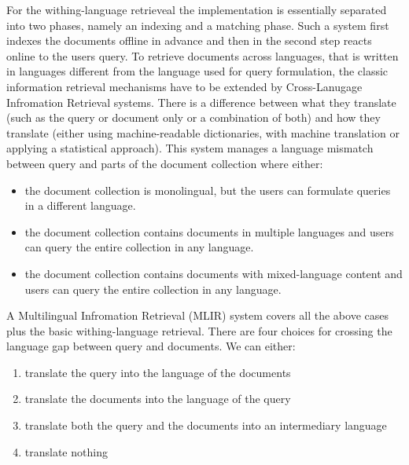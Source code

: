 \documentclass[journal]{IEEEtran}
\begin{document}
For the withing-language retrieveal the implementation is essentially separated into two phases, namely an indexing and a matching phase. Such a system first indexes the documents offline in advance and then in the second step reacts online to the users query. To retrieve documents across languages, that is written in languages different from the language used for query formulation, the classic information retrieval mechanisms have to be extended by Cross-Lanugage Infromation Retrieval systems. There is a difference between what they translate (such as the query or document only or a combination of both) and how they translate (either using machine-readable dictionaries, with machine translation or applying a statistical approach). This system manages a language mismatch between query and parts of the document collection where either:
\begin{itemize}
	\item the document collection is monolingual, but the users can formulate queries in a different language.
	\item the document collection contains documents in multiple languages and users can query the entire collection in any language.
	\item the document collection contains documents with mixed-language content and users can query the entire collection in any language.
\end{itemize}
A Multilingual Infromation Retrieval (MLIR) system covers all the above cases plus the basic withing-language retrieval. There are four choices for crossing the language gap between query and documents. We can either:
\begin{enumerate}
	\item translate the query into the language of the documents
	\item translate the documents into the language of the query
	\item translate both the query and the documents into an intermediary language
	\item translate nothing
\end{enumerate}
\end{document}
